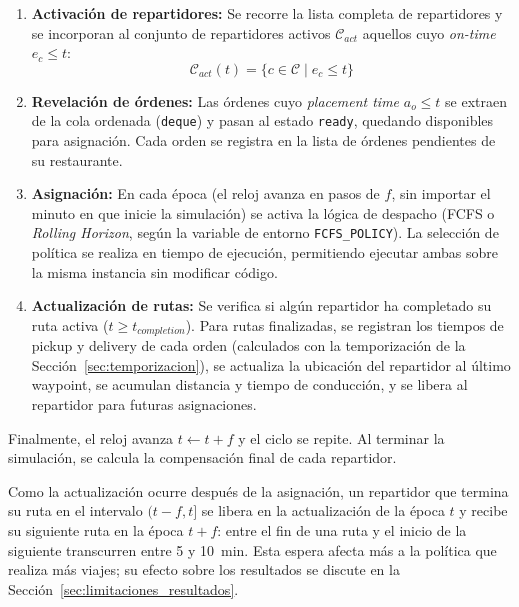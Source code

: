 \documentclass[12pt,letterpaper,oneside]{book}
\begin{document}
	\begin{enumerate}
		\item \textbf{Activación de repartidores:} Se recorre la lista completa de repartidores y se incorporan 
		al conjunto de repartidores activos $\mathcal{C}_{act}$ aquellos cuyo \textit{on-time} 
		$e_c \leq t$:
		\begin{equation}
			\mathcal{C}_{act}(t) = \{c \in \mathcal{C} \mid e_c \leq t\}
		\end{equation}

		\item \textbf{Revelación de órdenes:} Las órdenes cuyo \textit{placement time} $a_o \leq t$ se 
		extraen de la cola ordenada (\texttt{deque}) y pasan al estado \texttt{ready}, quedando 
		disponibles para asignación. Cada orden se registra en la lista de órdenes pendientes de 
		su restaurante.

		\item \textbf{Asignación:} En cada época (el reloj avanza en pasos de $f$, sin importar
		el minuto en que inicie la simulación) se activa la lógica de despacho 
		(FCFS o \textit{Rolling Horizon}, según la variable de entorno \texttt{FCFS\_POLICY}). La selección
		de política se realiza en tiempo de ejecución, permitiendo ejecutar ambas sobre la misma 
		instancia sin modificar código.

		\item \textbf{Actualización de rutas:} Se verifica si algún repartidor ha completado su ruta 
		activa ($t \geq t_{completion}$). Para rutas finalizadas, se registran los tiempos de 
		pickup y delivery de cada orden (calculados con la temporización de la
		Sección~\ref{sec:temporizacion}), se actualiza la ubicación del repartidor al último waypoint, 
		se acumulan distancia y tiempo de conducción, y se libera al repartidor para futuras 
		asignaciones.
	\end{enumerate}

	Finalmente, el reloj avanza $t \leftarrow t + f$ y el ciclo se repite. Al terminar la 
	simulación, se calcula la compensación final de cada repartidor.

	Como la actualización ocurre después de la asignación, un repartidor que termina su ruta en el
	intervalo $(t - f, t]$ se libera en la actualización de la época $t$ y recibe su siguiente
	ruta en la época $t + f$: entre el fin de una ruta y el inicio de la siguiente transcurren
	entre 5 y 10~min.  Esta espera afecta más a la política que realiza más viajes; su efecto
	sobre los resultados se discute en la Sección~\ref{sec:limitaciones_resultados}.
\end{document}
